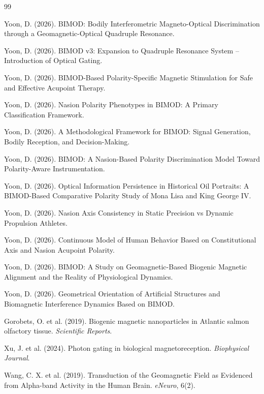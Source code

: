 \documentclass[12pt,a4paper]{article}
\begin{document}
\begin{thebibliography}{99}

Yoon, D. (2026). BIMOD: Bodily Interferometric Magneto-Optical Discrimination through a Geomagnetic-Optical Quadruple Resonance.

Yoon, D. (2026). BIMOD v3: Expansion to Quadruple Resonance System – Introduction of Optical Gating.

Yoon, D. (2026). BIMOD-Based Polarity-Specific Magnetic Stimulation for Safe and Effective Acupoint Therapy.

Yoon, D. (2026). Nasion Polarity Phenotypes in BIMOD: A Primary Classification Framework.

Yoon, D. (2026). A Methodological Framework for BIMOD: Signal Generation, Bodily Reception, and Decision-Making.

Yoon, D. (2026). BIMOD: A Nasion-Based Polarity Discrimination Model Toward Polarity-Aware Instrumentation.

Yoon, D. (2026). Optical Information Persistence in Historical Oil Portraits: A BIMOD-Based Comparative Polarity Study of Mona Lisa and King George IV.

Yoon, D. (2026). Nasion Axis Consistency in Static Precision vs Dynamic Propulsion Athletes.

Yoon, D. (2026). Continuous Model of Human Behavior Based on Constitutional Axis and Nasion Acupoint Polarity.

Yoon, D. (2026). BIMOD: A Study on Geomagnetic-Based Biogenic Magnetic Alignment and the Reality of Physiological Dynamics.

Yoon, D. (2026). Geometrical Orientation of Artificial Structures and Biomagnetic Interference Dynamics Based on BIMOD.

Gorobets, O. et al. (2019). Biogenic magnetic nanoparticles in Atlantic salmon olfactory tissue. \textit{Scientific Reports}.

Xu, J. et al. (2024). Photon gating in biological magnetoreception. \textit{Biophysical Journal}.

Wang, C. X. et al. (2019). Transduction of the Geomagnetic Field as Evidenced from Alpha-band Activity in the Human Brain. \textit{eNeuro}, 6(2).


\end{thebibliography}
\end{document}
